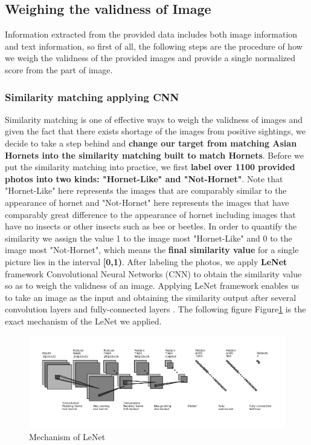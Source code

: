 \documentclass{mcmthesis}
\begin{document}
	\subsection{Weighing the validness of Image}
	\quad Information extracted from the provided data includes both image information and text information, so first of all, the following steps are the procedure of how we weigh the validness of the provided images and provide a single normalized score from the part of image.
		\subsubsection{Similarity matching applying CNN}
		\quad Similarity matching is one of effective ways to weigh the validness of images and given the fact that there exists shortage of the images from positive sightings, we decide to take a step behind and \textbf{change our target from matching Asian Hornets into the similarity matching built to match Hornets}. Before we put the similarity matching into practice, we first \textbf{label over 1100 provided photos into two kinds: "Hornet-Like" and "Not-Hornet"}. Note that "Hornet-Like" here represents the images that are comparably similar to the appearance of hornet and "Not-Hornet" here represents the images that have comparably great difference to the appearance of hornet including images that have no insects or other insects such as bee or beetles. In order to quantify the similarity we assign the value 1 to the image most "Hornet-Like" and 0 to the image most "Not-Hornet", which means the \textbf{final similarity value} for a single picture lies in the interval \textbf{[0,1)}. After labeling the photos, we apply \textbf{LeNet} framework Convolutional Neural Networks (CNN) to obtain the similarity value so as to weigh the validness of an image. Applying LeNet framework enables us to take an image as the input and obtaining the similarity output after several convolution layers and fully-connected layers \cite{LeNet}. The following figure Figure\ref{net} is the exact mechanism of the LeNet we applied.\\
		\begin{figure}[h]
			\centering
			\includegraphics[scale=0.6]{net.png}
			\caption{Mechanism of LeNet}
			\label{net}
		\end{figure}
\end{document}
